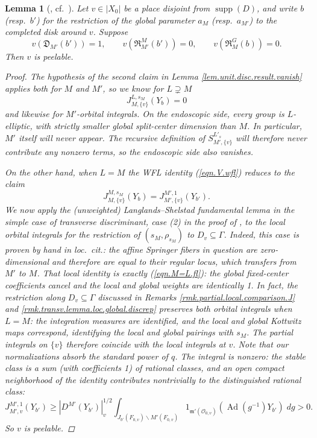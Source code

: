 \documentclass[openany]{amsbook}
\newtheorem{lemma}[theorem]{Lemma}
\theoremstyle{definition}
\theoremstyle{remark}
\numberwithin{equation}{section}
\renewcommand{\O}{\mathcal{O}}
\renewcommand{\-}{\operatorname{-}}
\newcommand{\on}[1]{\operatorname{#1}}
\newcommand{\fm}{\mathfrak{m}}
\renewcommand{\fm}{\mathfrak{m}}
\newcommand{\fD}{\mathfrak{D}}
\newcommand{\fR}{\mathfrak{R}}
\newcommand{\Ad}{\on{Ad}}
\begin{document}
\begin{lemma}[{\cite[Lemme 8.5.7]{ngofl}, cf.\ \cite[Lemme 17.7.3]{CLII}}]\label{lem.transv.disc}
    Let $v \in |X_0|$ be a place disjoint from $\on{supp}(D)$, and write $b$ (resp.\ $b'$) for the restriction of the global parameter $a_M$ (resp.\ $a_{M'}$) to the completed disk around $v$. Suppose
    \begin{equation}
        v(\fD_{M'}(b')) = 1, \qquad v(\fR_{M'}^M(b')) = 0, \qquad v(\fR_M^G(b)) = 0.\label{eqn.tranv.D}
    \end{equation}
    Then $v$ is peelable.
    \begin{proof}
        The hypothesis of the second claim in Lemma \ref{lem.unit.disc.result.vanish} applies both for $M$ and $M'$, so we know for $L \supsetneq M$
        $$
            J_{M,\{v\}}^{L,s_M}(Y_b) = 0
        $$
        and likewise for $M'$-orbital integrals. On the endoscopic side, every group is $L$-elliptic, with strictly smaller global split-center dimension than $M$. In particular, $M'$ itself will never appear. The recursive definition of $S^{L'_s}_{M', \{v\}}$ will therefore never contribute any nonzero terms, so the endoscopic side also vanishes. 
        
        On the other hand, when $L = M$ the WFL identity (\ref{eqn.V.wfl}) reduces to the claim
        \begin{equation}
            J_{M,\{v\}}^{M,s_M}(Y_b) = J_{M', \{v\}}^{M', 1}(Y_{b'}).\label{eqn.M=L.fl}
        \end{equation}
        We now apply the (unweighted) Langlands--Shelstad fundamental lemma in the simple case of transverse discriminant, case (2) in the proof of \cite[Lemme 8.5.7]{ngofl}, to the local orbital integrals for the restriction of $(s_M, \rho_{s_M})$ to $D_v \subseteq \Gamma$. Indeed, this case is proven by hand in \textit{loc.\ cit.}: the affine Springer fibers in question are zero-dimensional and therefore are equal to their regular locus, which transfers from $M'$ to $M$. That local identity is exactly (\ref{eqn.M=L.fl}): the global fixed-center coefficients cancel and the local and global weights are identically 1. In fact, the restriction along $D_v \subseteq \Gamma$ discussed in Remarks \ref{rmk.partial.local.comparison.J} and \ref{rmk.transv.lemma.loc.global.discrep} preserves both orbital integrals when $L = M$: the integration measures are identified, and the local and global Kottwitz maps correspond, identifying the local and global pairings with $s_M$. The partial integrals on $\{v\}$ therefore coincide with the local integrals at $v$. Note that our normalizations absorb the standard power of $q$. The integral is nonzero: the stable class is a sum (with coefficients 1) of rational classes, and an open compact neighborhood of the identity contributes nontrivially to the distinguished rational class:
        $$
            J_{M',v}^{M', 1}(Y_{b'}) \ge |D^{M'}(Y_{b'})|_v^{1/2} \int_{J_{b'}(F_{0,v}) \backslash M'(F_{0,v})} 1_{\fm'(\O_{0,v})}(\Ad(g^{-1}) Y_{b'}) \; dg > 0.
        $$
        So $v$ is peelable.
    \end{proof}
\end{lemma}
\end{document}
